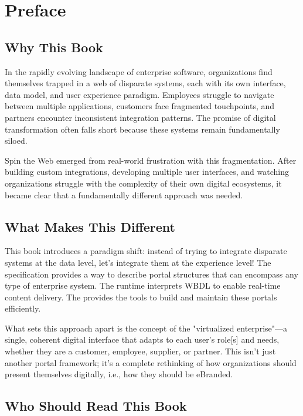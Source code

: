 
\chapter*{Preface}

\section*{Why This Book}

In the rapidly evolving landscape of enterprise software, organizations find themselves trapped in a web of disparate systems, each with its own interface, data model, and user experience paradigm. Employees struggle to navigate between multiple applications, customers face fragmented touchpoints, and partners encounter inconsistent integration patterns. The promise of digital transformation often falls short because these systems remain fundamentally siloed.

Spin the Web emerged from real-world frustration with this fragmentation. After building custom integrations, developing multiple user interfaces, and watching organizations struggle with the complexity of their own digital ecosystems, it became clear that a fundamentally different approach was needed.

\section*{What Makes This Different}

This book introduces a paradigm shift: instead of trying to integrate disparate systems at the data level, let's integrate them at the experience level! The \wbdl specification provides a way to describe portal structures that can encompass any type of enterprise system. The \webspinner runtime interprets WBDL to enable real-time content delivery. The \studio provides the tools to build and maintain these portals efficiently.

What sets this approach apart is the concept of the "virtualized enterprise"—a single, coherent digital interface that adapts to each user's role[s] and needs, whether they are a customer, employee, supplier, or partner. This isn't just another portal framework; it's a complete rethinking of how organizations should present themselves digitally, i.e., how they should be eBranded.

\section*{Who Should Read This Book}


